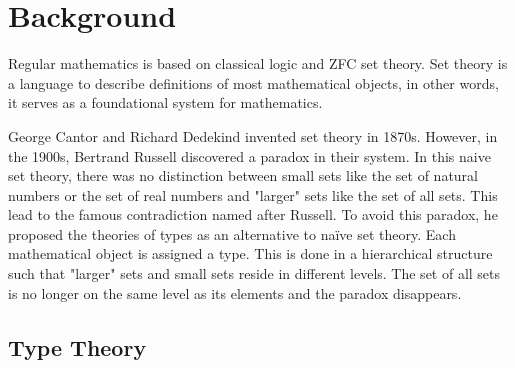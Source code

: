 \chapter{Background}
\label{bg}

Regular mathematics is based on classical logic and ZFC set theory. Set theory is a language to describe definitions of most mathematical objects, in other words, it serves as a foundational system for mathematics.

George Cantor and Richard Dedekind invented set theory in 1870s. However, in the 1900s, Bertrand Russell discovered a paradox in their system. In this naive set theory, there was no distinction between small sets like the set of natural numbers or the set of real numbers and "larger" sets like the set of all sets. This lead to the famous contradiction named after Russell. To avoid this paradox, he
proposed the theories of types \cite{rus:1903} as an alternative to
naïve set theory. Each mathematical object is assigned a type. This is done in a hierarchical structure such that "larger" sets and small sets reside in different levels. The set of all
sets is no longer on the same level as its elements and the
paradox disappears.


\section{Type Theory}



